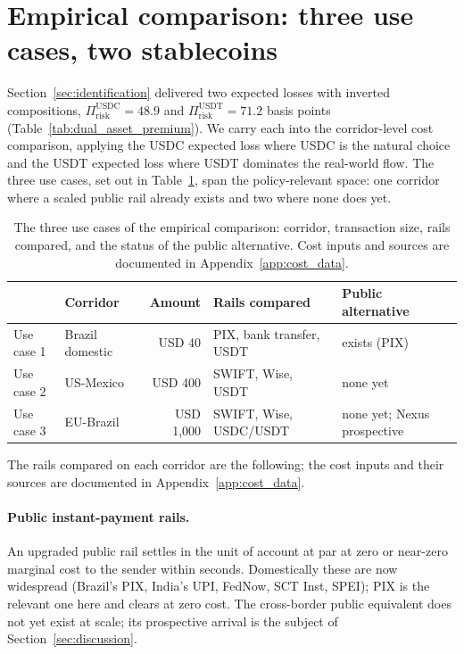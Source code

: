 \section{Empirical comparison: three use cases, two stablecoins}\label{sec:empirical_comparison}

Section~\ref{sec:identification} delivered two expected losses with inverted compositions, $\Pi_{\text{risk}}^{\text{USDC}} = 48.9$ and $\Pi_{\text{risk}}^{\text{USDT}} = 71.2$ basis points (Table~\ref{tab:dual_asset_premium}). We carry each into the corridor-level cost comparison, applying the USDC expected loss where USDC is the natural choice and the USDT expected loss where USDT dominates the real-world flow. The three use cases, set out in Table~\ref{tab:use_cases}, span the policy-relevant space: one corridor where a scaled public rail already exists and two where none does yet.

\begin{table}[H]
\centering
\caption{The three use cases of the empirical comparison: corridor, transaction size, rails compared, and the status of the public alternative. Cost inputs and sources are documented in Appendix~\ref{app:cost_data}.}\label{tab:use_cases}
\begin{tabularx}{\textwidth}{llr>{\raggedright\arraybackslash}X>{\raggedright\arraybackslash}X}
\toprule
 & Corridor & Amount & Rails compared & Public alternative \\
\midrule
Use case 1 & Brazil domestic & USD 40      & PIX, bank transfer, USDT & exists (PIX) \\
Use case 2 & US-Mexico       & USD 400     & SWIFT, Wise, USDT        & none yet \\
Use case 3 & EU-Brazil       & USD 1{,}000 & SWIFT, Wise, USDC/USDT   & none yet; Nexus prospective \\
\bottomrule
\end{tabularx}
\end{table}

The rails compared on each corridor are the following; the cost inputs and their sources are documented in Appendix~\ref{app:cost_data}.

\paragraph{Public instant-payment rails.} An upgraded public rail settles in the unit of account at par at zero or near-zero marginal cost to the sender within seconds. Domestically these are now widespread (Brazil's PIX, India's UPI, FedNow, SCT Inst, SPEI); PIX is the relevant one here and clears at zero cost. The cross-border public equivalent does not yet exist at scale; its prospective arrival is the subject of Section~\ref{sec:discussion}.

